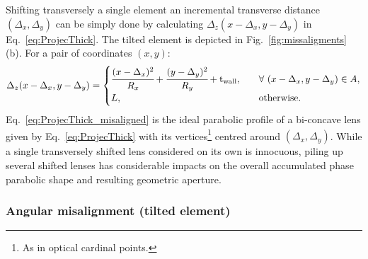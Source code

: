 \begin{refsection}
Shifting transversely a single element an incremental transverse distance $(\Delta_x,\Delta_y)$ can be simply done by calculating $\Delta_z(x-\Delta_x,y-\Delta_y)$ in Eq.~\ref{eq:ProjecThick}. The tilted element is depicted in Fig.~\ref{fig:missaligments}(b). For a pair of coordinates $(x,y)$:
\begin{equation}\label{eq:ProjecThick_misaligned}
    \Delta_z(x-\Delta_x,y-\Delta_y) = 
        \begin{cases}
      \cfrac{(x-\Delta_x)^2}{R_x}+\cfrac{(y-\Delta_y)^2}{R_y}+\text{t}_\text{wall}, &\quad\forall~(x-\Delta_x,y-\Delta_y) \in A,\\
      L, &\quad\text{otherwise}.
        \end{cases}
\end{equation}   
Eq.~\ref{eq:ProjecThick_misaligned} is the ideal parabolic profile of a bi-concave lens given by Eq.~\ref{eq:ProjecThick} with its vertices\footnote{As in optical cardinal points.} centred around $(\Delta_x,\Delta_y)$. While a single transversely shifted lens considered on its own is innocuous, piling up several shifted lenses has considerable impacts on the overall accumulated phase parabolic shape and resulting geometric aperture.


\subsubsection*{Angular misalignment (tilted element)}


\end{refsection}
